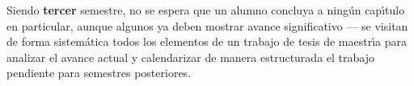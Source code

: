 \documentclass[10 pt]{article}
\begin{document}


Siendo {\bf tercer} semestre, no se espera que un alumno concluya a
ning\'{u}n cap\'{\i}tulo en particular, aunque algunos ya deben
mostrar avance significativo --- se visitan de forma sistem\'{a}tica
todos los elementos de un trabajo de tesis de maestr\'{\i}a para
analizar el avance actual y calendarizar de manera estructurada el
trabajo pendiente para semestres posteriores.


\end{document}
